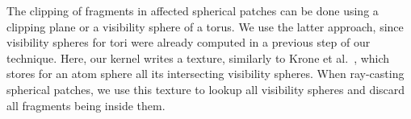 The clipping of fragments in affected spherical patches can be done using a clipping plane or a visibility sphere of a torus.
We use the latter approach, since visibility spheres for tori were already computed in a previous step of our technique.
Here, our kernel writes a texture, similarly to Krone et al.~\cite{krone2011parallel}, which stores for an atom sphere all its intersecting visibility spheres.
When ray-casting spherical patches, we use this texture to lookup all visibility spheres and discard all fragments being inside them.
